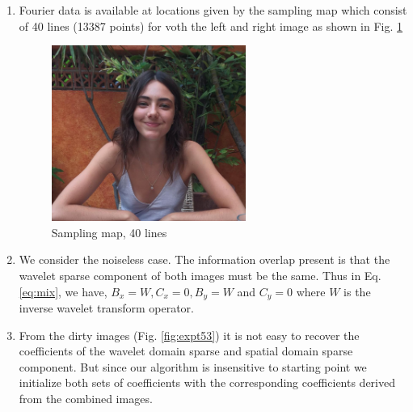 \begin{enumerate}
\item Fourier data is available at locations given by the sampling map which consist of 40 lines (13387 points) for voth the left and right image as shown in Fig. \ref{fig:expt52}
\begin{figure}[!t]

\begin{center}  \vspace{-0.1in}

\includegraphics[width=2.5in]{images/expt5/2.png}

\caption [Sampling map, 40 lines]{Sampling map, 40 lines}
\label{fig:expt52}
\end{center}
\end{figure}

\item We consider the noiseless case. The information overlap present is that the wavelet sparse component of both images must be the same. Thus in Eq. \ref{eq:mix}, we have, $B_x = W, C_x = 0, B_y = W$ and $C_y = 0$ where $W$ is the inverse wavelet transform operator. 
\item From the dirty images (Fig. \ref{fig:expt53}) it is not easy to recover the coefficients of the wavelet domain sparse and spatial domain sparse component. But since our algorithm is insensitive to starting point we initialize both sets of coefficients with the corresponding coefficients derived from the combined images.


\end{enumerate}
